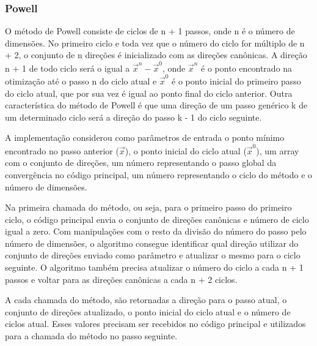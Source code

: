 \documentclass[10pt, a4paper]{article}
\begin{document}
\subsubsection{Powell}

O método de Powell consiste de ciclos de n + 1 passos, onde n é o número de dimensões.
No primeiro ciclo e toda vez que o número do ciclo for múltiplo de n + 2, 
o conjunto de n direções é inicializado com as direções canônicas.
A direção n + 1 de todo ciclo será o igual a  $\overrightarrow{x}^n - \overrightarrow{x}^0$, 
onde $\overrightarrow{x}^n$ é o ponto encontrado na otimização até o passo n do ciclo atual e
$\overrightarrow{x}^0$ é o ponto inicial do primeiro passo do ciclo atual,
que por sua vez é igual ao ponto final do ciclo anterior.
Outra característica do método de Powell é que uma direção de um passo genérico k de um determinado ciclo será 
a direção do passo k - 1 do ciclo seguinte.

A implementação considerou como parâmetros de entrada o ponto mínimo encontrado no passo anterior ($\overrightarrow{x}$),
o ponto inicial do ciclo atual ($\overrightarrow{x}^0$), um array com o conjunto de direções,
um número representando o passo global da convergência no código principal,
um número representando o ciclo do método e o número de dimensões.

Na primeira chamada do método, ou seja, para o primeiro passo do primeiro ciclo,
o código principal envia o conjunto de direções canônicas e número de ciclo igual a zero.
Com manipulações com o resto da divisão do número do passo pelo número de dimensões,
o algoritmo consegue identificar qual direção utilizar do conjunto de direções
enviado como parâmetro e atualizar o mesmo para o ciclo seguinte.
O algoritmo também precisa atualizar o número do ciclo a cada n + 1 passos e
voltar para as direções canônicas a cada n + 2 ciclos.

A cada chamada do método, são retornadas a direção para o passo atual, o conjunto de direções atualizado,
o ponto inicial do ciclo atual  e o número de ciclos atual.
Esses valores precisam ser recebidos no código principal e utilizados para a chamada do método no passo seguinte.
\end{document}
